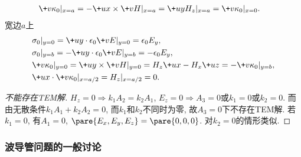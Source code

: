 \documentclass[hidelinks]{ctexart}
\begin{document}
\begin{cenum}
\begin{align*}
        & \+v\kappa_0\vert_{x=a} = -\+ux\times \+vH\vert_{x=a} = \+uy H_z\vert_{x=a} = \+v\kappa_0\vert_{x=0}.
    \end{align*}
    宽边$a$上
    \begin{align*}
        &\sigma_0\vert_{y=0} = \+uy\cdot \epsilon_0 \+vE\vert_{y=0} = \epsilon_0 E_y, \\
        &\sigma_0\vert_{y=b} = -\+uy\cdot \epsilon_0 \+vE\vert_{y=b} = -\epsilon_0 E_y, \\
        &\+v\kappa_0\vert_{y=0} = \+uy\times \+vH\vert_{y=0} = H_z \+ux - H_x\+uz = -\+v\kappa_0\vert_{y=b}, \\
        &\+ux\cdot \+v\kappa_0 \vert_{x=a/2} = H_z\vert_{x=a/2} = 0.
    \end{align*}
\end{cenum}
\begin{proof}[不能存在TEM解]
    $H_z = 0 \Rightarrow k_1 A_2 = k_2 A_1$, $E_z = 0 \Rightarrow A_3 = 0$或$k_1 = 0$或$k_2 = 0$. 而由无散条件$k_1 A_1 + k_2 A_2 = 0$, 而$k_1$和$k_2$不同时为零, 故$A_3 = 0$下不存在TEM解. 若$k_1 = 0$, 有$A_1 = 0$, $\pare{E_x,E_y,E_z} = \pare{0,0,0}$. 对$k_2=0$的情形类似.
\end{proof}


\subsubsection{波导管问题的一般讨论} %
\label{ssub:波导管问题的一般讨论}
\end{document}
